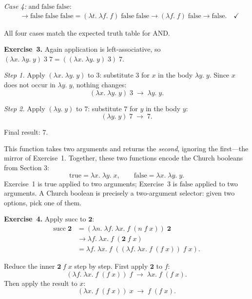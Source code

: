 \documentclass[11pt]{article}
\begin{document}
\emph{Case 4:} $\text{and}\;\text{false}\;\text{false}$:
\begin{align*}
  &\longrightarrow \text{false}\;\text{false}\;\text{false}
   = (\lambda t.\;\lambda f.\; f)\;\text{false}\;\text{false}
   \longrightarrow (\lambda f.\; f)\;\text{false}
   \longrightarrow \text{false}. \quad\checkmark
\end{align*}

All four cases match the expected truth table for AND\@.

\medskip
\textbf{Exercise~3.}
Again application is left-associative, so
$(\lambda x.\;\lambda y.\; y)\; 3\; 7 = ((\lambda x.\;\lambda y.\; y)\;
3)\; 7$.

\emph{Step 1.}  Apply $(\lambda x.\;\lambda y.\; y)$ to $3$:
substitute $3$ for $x$ in the body $\lambda y.\; y$.  Since $x$ does
not occur in $\lambda y.\; y$, nothing changes:
\[
  (\lambda x.\;\lambda y.\; y)\; 3 \;\longrightarrow\; \lambda y.\; y.
\]

\emph{Step 2.}  Apply $(\lambda y.\; y)$ to $7$: substitute $7$ for
$y$ in the body $y$:
\[
  (\lambda y.\; y)\; 7 \;\longrightarrow\; 7.
\]

Final result: $7$.

This function takes two arguments and returns the \emph{second},
ignoring the first---the mirror of Exercise~1.  Together, these two
functions encode the Church booleans from Section 3:
\[
  \text{true} = \lambda x.\; \lambda y.\; x,
  \qquad
  \text{false} = \lambda x.\; \lambda y.\; y.
\]
Exercise~1 is $\text{true}$ applied to two arguments; Exercise~3 is
$\text{false}$ applied to two arguments.  A Church boolean is
precisely a two-argument selector: given two options, pick one of
them.

\medskip
\textbf{Exercise~4.}
Apply $\text{succ}$ to $\mathbf{2}$:
\begin{align*}
  \text{succ}\;\mathbf{2}
    &= (\lambda n.\;\lambda f.\;\lambda x.\; f\;(n\; f\; x))\;\mathbf{2} \\
    &\longrightarrow \lambda f.\;\lambda x.\; f\;(\mathbf{2}\; f\; x) \\
    &= \lambda f.\;\lambda x.\; f\;((\lambda f.\;\lambda x.\; f\;(f\; x))\; f\; x).
\end{align*}

Reduce the inner $\mathbf{2}\; f\; x$ step by step.  First apply
$\mathbf{2}$ to $f$:
\[
  (\lambda f.\;\lambda x.\; f\;(f\; x))\; f
    \;\longrightarrow\; \lambda x.\; f\;(f\; x).
\]
Then apply the result to $x$:
\[
  (\lambda x.\; f\;(f\; x))\; x
    \;\longrightarrow\; f\;(f\; x).
\]
\end{document}
